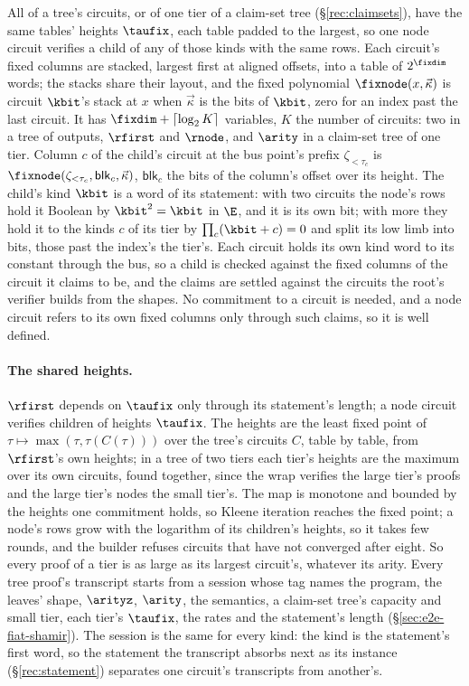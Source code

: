 All of a tree's circuits, or of one tier of a claim-set tree (\S\ref{rec:claimsets}), have the same tables' heights $\taufix$, each table padded to the largest, so one node circuit verifies a child of any of those kinds with the same rows. Each circuit's fixed columns are stacked, largest first at aligned offsets, into a table of $2^{\fixdim}$ words; the stacks share their layout, and the fixed polynomial $\fixnode(x,\vec\kappa)$ is circuit $\kbit$'s stack at $x$ when $\vec\kappa$ is the bits of $\kbit$, zero for an index past the last circuit. It has $\fixdim+\lceil\log_2 K\rceil$ variables, $K$ the number of circuits: two in a tree of outputs, $\rfirst$ and $\rnode$, and $\arity$ in a claim-set tree of one tier. Column $c$ of the child's circuit at the bus point's prefix $\zeta_{<\tau_c}$ is $\fixnode(\zeta_{<\tau_c},\mathsf{blk}_c,\vec\kappa)$, $\mathsf{blk}_c$ the bits of the column's offset over its height. The child's kind $\kbit$ is a word of its statement: with two circuits the node's rows hold it Boolean by $\kbit^2=\kbit$ in $\E$, and it is its own bit; with more they hold it to the kinds $c$ of its tier by $\prod_c(\kbit+c)=0$ and split its low limb into bits, those past the index's the tier's. Each circuit holds its own kind word to its constant through the bus, so a child is checked against the fixed columns of the circuit it claims to be, and the claims are settled against the circuits the root's verifier builds from the shapes. No commitment to a circuit is needed, and a node circuit refers to its own fixed columns only through such claims, so it is well defined.

\paragraph{The shared heights.} $\rfirst$ depends on $\taufix$ only through its statement's length; a node circuit verifies children of heights $\taufix$. The heights are the least fixed point of $\tau\mapsto\max(\tau,\tau(C(\tau)))$ over the tree's circuits $C$, table by table, from $\rfirst$'s own heights; in a tree of two tiers each tier's heights are the maximum over its own circuits, found together, since the wrap verifies the large tier's proofs and the large tier's nodes the small tier's. The map is monotone and bounded by the heights one commitment holds, so Kleene iteration reaches the fixed point; a node's rows grow with the logarithm of its children's heights, so it takes few rounds, and the builder refuses circuits that have not converged after eight. So every proof of a tier is as large as its largest circuit's, whatever its arity. Every tree proof's transcript starts from a session whose tag names the program, the leaves' shape, $\arityz$, $\arity$, the semantics, a claim-set tree's capacity and small tier, each tier's $\taufix$, the rates and the statement's length (\S\ref{sec:e2e-fiat-shamir}). The session is the same for every kind: the kind is the statement's first word, so the statement the transcript absorbs next as its instance (\S\ref{rec:statement}) separates one circuit's transcripts from another's.


